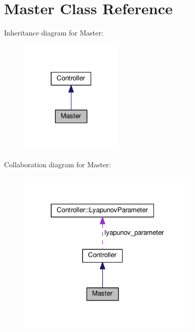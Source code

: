 \hypertarget{classMaster}{}\section{Master Class Reference}
\label{classMaster}


Inheritance diagram for Master\+:\nopagebreak
\begin{figure}[H]
\begin{center}
\leavevmode
\includegraphics[width=139pt]{classMaster__inherit__graph}
\end{center}
\end{figure}


Collaboration diagram for Master\+:
\nopagebreak
\begin{figure}[H]
\begin{center}
\leavevmode
\includegraphics[width=247pt]{classMaster__coll__graph}
\end{center}
\end{figure}
